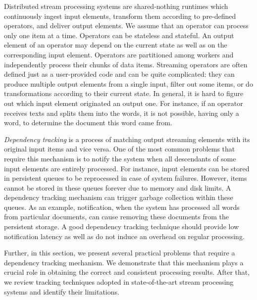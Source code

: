 \label {fs-acker-motivation}

Distributed stream processing systems are shared-nothing runtimes which continuously ingest input elements, transform them according to pre-defined operators, and deliver output elements. We assume that an operator can process only one item at a time. Operators can be stateless and stateful. An output element of an operator may depend on the current state as well as on the corresponding input element. Operators are partitioned among workers and independently process their chunks of data items. Streaming operators are often defined just as a user-provided code and can be quite complicated: they can produce multiple output elements from a single input, filter out some items, or do transformations according to their current state. In general, it is hard to figure out which input element originated an output one. For instance, if an operator receives texts and splits them into the words, it is not possible, having only a word, to determine the document this word came from.

{\em Dependency tracking} is a process of matching output streaming elements with its original input items and vice versa. One of the most common problems that require this mechanism is to notify the system when all descendants of some input elements are entirely processed. For instance, input elements can be stored in persistent queues to be reprocessed in case of system failures. However, items cannot be stored in these queues forever due to memory and disk limits. A dependency tracking mechanism can trigger garbage collection within these queues. As an example, notification, when the system has processed all words from particular documents, can cause removing these documents from the persistent storage. A good dependency tracking technique should provide low notification latency as well as do not induce an overhead on regular processing.

Further, in this section, we present several practical problems that require a dependency tracking mechanism. We demonstrate that this mechanism plays a crucial role in obtaining the correct and consistent processing results. After that, we review tracking techniques adopted in state-of-the-art stream processing systems and identify their limitations. 

